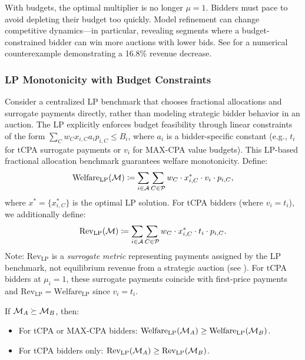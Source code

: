 With budgets, the optimal multiplier is no longer $\mu = 1$. Bidders must pace to avoid depleting their budget too quickly. Model refinement can change competitive dynamics---in particular, revealing segments where a budget-constrained bidder can win more auctions with lower bids. See  for a numerical counterexample demonstrating a 16.8\% revenue decrease.

\subsubsection{LP Monotonicity with Budget Constraints}

\begin{theorem}
\label{thm:lp-mono}
Consider a centralized LP benchmark that chooses fractional allocations and surrogate payments directly, rather than modeling strategic bidder behavior in an auction. The LP explicitly enforces budget feasibility through linear constraints of the form $\sum_C w_C x_{i,C} a_i p_{i,C} \le B_i$, where $a_i$ is a bidder-specific constant (e.g., $t_i$ for tCPA surrogate payments or $v_i$ for MAX-CPA value budgets). This LP-based fractional allocation benchmark guarantees welfare monotonicity. Define:
\begin{equation}
\text{Welfare}_{\text{LP}}(\mathcal{M}) \coloneqq \sum_{i \in \mathcal{A}} \sum_{C \in \mathcal{P}} w_C \cdot x^*_{i,C} \cdot v_i \cdot p_{i,C},
\end{equation}
where $x^* = \{x^*_{i,C}\}$ is the optimal LP solution. For tCPA bidders (where $v_i = t_i$), we additionally define:
\begin{equation}
\text{Rev}_{\text{LP}}(\mathcal{M}) \coloneqq \sum_{i \in \mathcal{A}} \sum_{C \in \mathcal{P}} w_C \cdot x^*_{i,C} \cdot t_i \cdot p_{i,C}.
\end{equation}
Note: $\text{Rev}_{\text{LP}}$ is a \emph{surrogate metric} representing payments assigned by the LP benchmark, not equilibrium revenue from a strategic auction (see ). For tCPA bidders at $\mu_i=1$, these surrogate payments coincide with first-price payments and $\text{Rev}_{\text{LP}} = \text{Welfare}_{\text{LP}}$ since $v_i = t_i$.

If $\mathcal{M}_A \succeq \mathcal{M}_B$, then:
\begin{itemize}
    \item For tCPA or MAX-CPA bidders: $\text{Welfare}_{\text{LP}}(\mathcal{M}_A) \geq \text{Welfare}_{\text{LP}}(\mathcal{M}_B)$.
    \item For tCPA bidders only: $\text{Rev}_{\text{LP}}(\mathcal{M}_A) \geq \text{Rev}_{\text{LP}}(\mathcal{M}_B)$.
\end{itemize}
\end{theorem}

